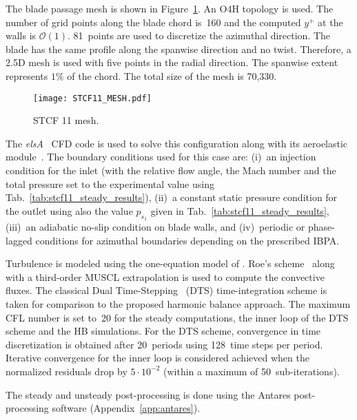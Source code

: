 
The blade passage mesh is shown in Figure~\ref{fig:stcf11_mesh}.
An O4H topology is used.
The number of grid points along the blade
chord is~160 and the computed $y^+$ at the walls is $\mathcal{O}(1)$.
81~points are used to discretize the azimuthal direction.
The blade has the same profile along the spanwise direction and no
twist. Therefore, a 2.5D mesh is used with five points 
in the radial direction. The spanwise
extent represents $1\%$ of the chord. 
The total size of the mesh is 70,330.
\begin{figure}[htp]
  \centering
  \texttt{[image: STCF11\_MESH.pdf]}
  \caption{STCF 11 mesh.}
  \label{fig:stcf11_mesh}
\end{figure}

The \textit{elsA}~\cite{Cambier2013} CFD code is used 
to solve this configuration along with its aeroelastic
module~\cite{CIDugeai2011}.
The boundary conditions used for this case are: (i)~an
injection condition  for the inlet (with the relative flow angle,
the Mach number and the total pressure
set to the experimental value using Tab.~\ref{tab:stcf11_steady_results}), 
(ii)~a constant static pressure
condition for the outlet using also the value $p_{s_1}$
given in Tab.~\ref{tab:stcf11_steady_results},  
(iii)~an adiabatic no-slip condition on
blade walls, and (iv)~periodic or phase-lagged conditions 
for azimuthal boundaries depending on the  
prescribed IBPA.

Turbulence is modeled using the one-equation model of
\citet{Spalart1992}.  Roe's scheme~\cite{Roe1981} along with a 
third-order MUSCL extrapolation 
is used to compute the convective fluxes.
The classical Dual Time-Stepping~\cite{Jameson1981} (DTS)
time-integration scheme is taken for comparison to the
proposed harmonic balance approach.
The maximum
CFL number is set to~20 for the steady computations,  the inner loop
of the DTS scheme and the HB simulations.  For the DTS scheme,  
convergence in time discretization is obtained
after 20~periods using 128~time steps per period.  Iterative convergence 
for the inner loop is considered achieved when the normalized
residuals drop by $5\cdot 10^{-2}$ (within a maximum of
50~sub-iterations).

The steady and unsteady post-processing is done using the
Antares post-processing software 
(Appendix~\ref{app:antares}).

